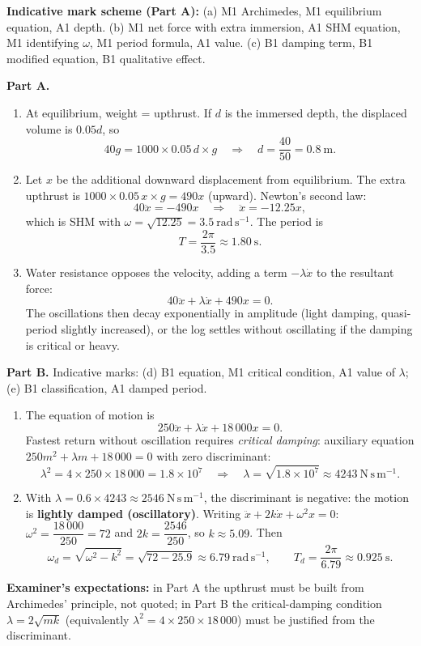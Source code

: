 \documentclass[11pt]{article}
\begin{document}
\begin{corrige}
\textbf{Indicative mark scheme (Part A):} (a) M1 Archimedes, M1 equilibrium equation, A1 depth. (b) M1 net force with extra immersion, A1 SHM equation, M1 identifying $\omega$, M1 period formula, A1 value. (c) B1 damping term, B1 modified equation, B1 qualitative effect.

\textbf{Part A.}
\begin{enumerate}
\item At equilibrium, weight = upthrust. If $d$ is the immersed depth, the displaced volume is $0.05d$, so
\[
40g = 1000 \times 0.05\,d \times g \quad\Longrightarrow\quad d = \frac{40}{50} = 0.8\ \mathrm{m}.
\]
\item Let $x$ be the additional downward displacement from equilibrium. The extra upthrust is $1000 \times 0.05\,x \times g = 490x$ (upward). Newton's second law:
\[
40\ddot{x} = -490x \quad\Longrightarrow\quad \ddot{x} = -12.25x,
\]
which is SHM with $\omega = \sqrt{12.25} = 3.5\ \mathrm{rad\,s^{-1}}$. The period is
\[
T = \frac{2\pi}{3.5} \approx 1.80\ \mathrm{s}.
\]
\item Water resistance opposes the velocity, adding a term $-\lambda\dot{x}$ to the resultant force:
\[
40\ddot{x} + \lambda\dot{x} + 490x = 0.
\]
The oscillations then decay exponentially in amplitude (light damping, quasi-period slightly increased), or the log settles without oscillating if the damping is critical or heavy.
\end{enumerate}

\textbf{Part B.} Indicative marks: (d) B1 equation, M1 critical condition, A1 value of $\lambda$; (e) B1 classification, A1 damped period.
\begin{enumerate}
\item[(d)] The equation of motion is
\[
250\ddot{x} + \lambda\dot{x} + 18\,000x = 0.
\]
Fastest return without oscillation requires \emph{critical damping}: auxiliary equation $250m^2 + \lambda m + 18\,000 = 0$ with zero discriminant:
\[
\lambda^2 = 4 \times 250 \times 18\,000 = 1.8\times 10^{7}
\quad\Longrightarrow\quad \lambda = \sqrt{1.8\times10^{7}} \approx 4243\ \mathrm{N\,s\,m^{-1}}.
\]
\item[(e)] With $\lambda = 0.6 \times 4243 \approx 2546\ \mathrm{N\,s\,m^{-1}}$, the discriminant is negative: the motion is \textbf{lightly damped (oscillatory)}. Writing $\ddot{x} + 2k\dot{x} + \omega^2 x = 0$: $\omega^2 = \dfrac{18\,000}{250} = 72$ and $2k = \dfrac{2546}{250}$, so $k \approx 5.09$. Then
\[
\omega_d = \sqrt{\omega^2 - k^2} = \sqrt{72 - 25.9} \approx 6.79\ \mathrm{rad\,s^{-1}},
\qquad T_d = \frac{2\pi}{6.79} \approx 0.925\ \mathrm{s}.
\]
\end{enumerate}
\textbf{Examiner's expectations:} in Part A the upthrust must be built from Archimedes' principle, not quoted; in Part B the critical-damping condition $\lambda = 2\sqrt{mk}$ (equivalently $\lambda^2 = 4 \times 250 \times 18\,000$) must be justified from the discriminant.
\end{corrige}
\end{document}
